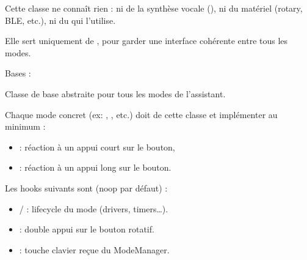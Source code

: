 \documentclass[letterpaper,10pt,french]{sphinxmanual}
\begin{document}
\sphinxAtStartPar
Cette classe ne connaît rien :
\sphinxhyphen{} ni de la synthèse vocale (),
\sphinxhyphen{} ni du matériel (rotary, BLE, etc.),
\sphinxhyphen{} ni du  qui l’utilise.

\sphinxAtStartPar
Elle sert uniquement de , pour garder une interface
cohérente entre tous les modes.

\begin{fulllineitems}
\label{\detokenize{api/core:core.mode_base.Mode}}
\pysigstartsignatures
\pysiglinewithargsret
{}
{}
{}
\pysigstopsignatures
\sphinxAtStartPar
Bases : 

\sphinxAtStartPar
Classe de base abstraite pour tous les modes de l’assistant.

\sphinxAtStartPar
Chaque mode concret (ex: , , etc.)
doit  de cette classe et implémenter au minimum :
\begin{itemize}
\item {} 
\sphinxAtStartPar
{} : réaction à un appui court sur le bouton,

\item {} 
\sphinxAtStartPar
{}  : réaction à un appui long sur le bouton.

\end{itemize}

\sphinxAtStartPar
Les hooks suivants sont  (no\sphinxhyphen{}op par défaut) :
\begin{itemize}
\item {} 
\sphinxAtStartPar
{} /  : lifecycle du mode (drivers, timers…).

\item {} 
\sphinxAtStartPar
{} : double appui sur le bouton rotatif.

\item {} 
\sphinxAtStartPar
{} : touche clavier reçue du ModeManager.


\end{itemize}
\end{fulllineitems}
\end{document}
